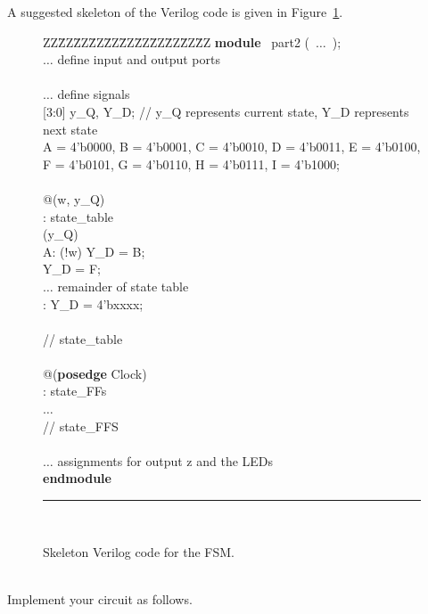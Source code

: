 \documentclass[epsfig,10pt,fullpage]{article}
\begin{document}
A suggested skeleton of the Verilog code is given in Figure~\ref{fig:skeleton_code}.

\begin{figure}[H]
\begin{center}
\begin{minipage}[t]{12.5 cm}
\begin{tabbing}
ZZ\=ZZ\=ZZ\=ZZ\=ZZ\=ZZ\=ZZ\=ZZ\=ZZ\=ZZ\=ZZ\kill
{\bf module} ~part2 (~$\ldots$~);\\
\>$\ldots$ define input and output ports\\
~\\
\>$\ldots$ define signals\\
 [3:0] y\_Q, Y\_D;  \>\>\>\>\>\>\>\>// y\_Q represents current state, Y\_D represents next state\\
 A = 4'b0000, B = 4'b0001, C = 4'b0010, D = 4'b0011, E = 4'b0100,\\
\>\>F = 4'b0101, G = 4'b0110, H = 4'b0111, I = 4'b1000;\\
~\\
 @(w, y\_Q)\\
: state\_table\\
\> (y\_Q)\\
\>\>\>A:	 (!w) Y\_D = B;\\
\>\>\> Y\_D = F;\\
\>\>\>$\ldots$ remainder of state table \\
\>\>: Y\_D = 4'bxxxx;\\
\>\\
 // state\_table\\
\\
 @({\bf posedge} Clock)\\
: state\_FFs\\
\>\>$\ldots$ \\
 // state\_FFS\\
\\
\>$\ldots$ assignments for output z and the LEDs\\
{\bf endmodule}
~\rule{5.0in}{0in}\\
\end{tabbing}
\end{minipage}
\end{center}
\caption{Skeleton Verilog code for the FSM.}
\label{fig:skeleton_code}
\end{figure}
~\\
Implement your circuit as follows.
\end{document}
